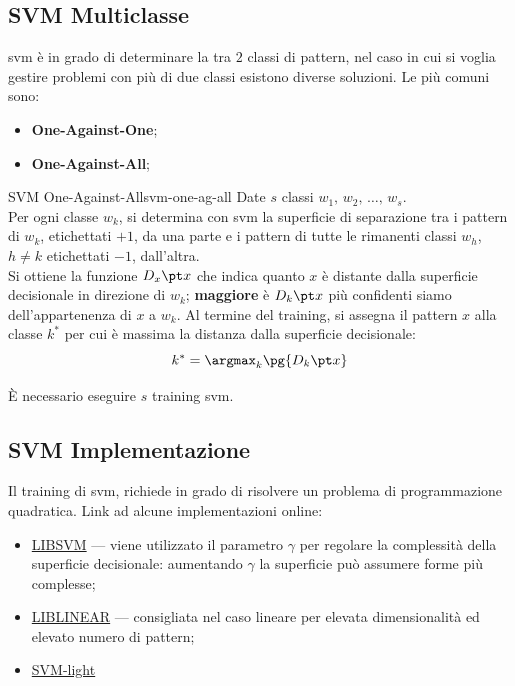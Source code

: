 \subsection{SVM Multiclasse}\label{sec:svm_multiclasse} %
\ac{svm} è in grado di determinare la  tra $2$ classi di pattern, nel caso in cui si voglia gestire problemi con più di due classi esistono diverse soluzioni.
Le più comuni sono:
\begin{itemize}
    \item \textbf{One-Against-One};
    \item \textbf{One-Against-All};
\end{itemize}
\begin{definition}{SVM One-Against-All}{svm-one-ag-all}
    Date $s$ classi $w_1,\,w_2,\,\dots,\,w_s$.
    \\
    Per ogni classe $w_k$, si determina con \ac{svm} la superficie di separazione tra i pattern di $w_k$, etichettati $+1$, da una parte e i pattern di tutte le rimanenti classi $w_h$, $h \ne k$ etichettati $-1$, dall'altra.
    \\
    Si ottiene la funzione $D_x\pt x$ che indica quanto $x$ è distante dalla superficie decisionale in direzione di $w_k$; \textbf{maggiore} è $D_k\pt x$ più confidenti siamo dell'appartenenza di $x$ a $w_k$.
    \emptyln{}
    Al termine del training, si assegna il pattern $x$ alla classe $k^*$ per cui è massima la distanza dalla superficie decisionale:
    \[
        k^* = \argmax_k{\pg{D_k\pt x}}
    \]
    \begin{note}
        È necessario eseguire $s$ training \ac{svm}.
    \end{note}
\end{definition}
\subsection{SVM Implementazione}\label{sec:svm_implementazione} %
Il training di \ac{svm}, richiede  in grado di risolvere un problema di programmazione quadratica.
Link ad alcune implementazioni online:
\begin{itemize}
    \item \href{https://www.csie.ntu.edu.tw/~cjlin/libsvm/}{LIBSVM} --- viene utilizzato il parametro $\gamma$ per regolare la complessità della superficie decisionale: aumentando $\gamma$ la superficie può assumere forme più complesse;
    \item \href{https://www.csie.ntu.edu.tw/~cjlin/liblinear/}{LIBLINEAR} --- consigliata nel caso lineare per elevata dimensionalità ed elevato numero di pattern;
    \item \href{http://svmlight.joachims.org}{SVM-light}
\end{itemize}
